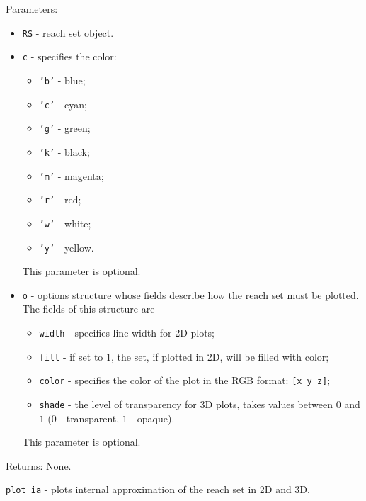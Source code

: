 \documentclass{report}
\begin{document}
Parameters:
\begin{itemize}
\item {\tt RS} - reach set object.
\item {\tt c} - specifies the color:
\begin{itemize}
\item {\tt 'b'} - blue;
\item {\tt 'c'} - cyan;
\item {\tt 'g'} - green;
\item {\tt 'k'} - black;
\item {\tt 'm'} - magenta;
\item {\tt 'r'} - red;
\item {\tt 'w'} - white;
\item {\tt 'y'} - yellow.
\end{itemize}
This parameter is optional.
\item {\tt o} - options structure whose fields describe how the reach set
must be plotted. The fields of this structure are
\begin{itemize}
\item {\tt width} - specifies line width for 2D plots;
\item {\tt fill} - if set to $1$, the set, if plotted in 2D,
will be filled with color;
\item {\tt color} - specifies the color of the plot in the RGB format:
{\tt [x y z]};
\item {\tt shade} - the level of transparency for 3D plots, takes values
between $0$ and $1$ ($0$ - transparent, $1$ - opaque).
\end{itemize}
This parameter is optional.
\end{itemize}

Returns: None.

\newpage

{\Large {\tt plot\_ia}} - plots internal approximation of the reach set
in 2D and 3D.
\end{document}
